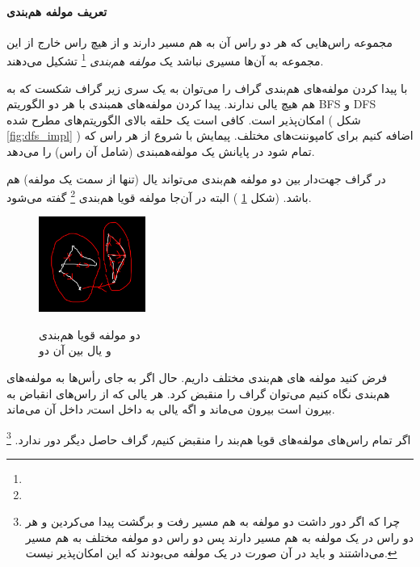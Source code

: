 \paragraph{تعریف مولفه هم‌بندی}
مجموعه‌ راس‌هایی که هر دو راس آن به هم مسیر دارند و از هیچ راس خارج از این مجموعه به آن‌ها مسیری نباشد یک 
\textit{
مولفه هم‌بندی
}
\footnote{}
تشکیل می‌دهند.

با پیدا کردن مولفه‌های هم‌بندی گراف را می‌توان به یک سری زیر گراف شکست که به هم هیچ یالی ندارند.
پیدا کردن مولفه‌های همبندی با هر دو الگوریتم
BFS
و 
DFS
امکان‌پذیر است.
کافی است یک حلقه بالای الگوریتم‌‌های مطرح شده (
شکل 
\ref{fig:dfs_impl}
)
اضافه کنیم برای کامپوننت‌های مختلف.
پیمایش با شروع از هر راس که تمام شود در پایانش یک مولفه‌همبندی (شامل آن راس) را می‌دهد.

در گراف جهت‌دار بین دو مولفه هم‌بندی می‌تواند یال (تنها از سمت یک مولفه) هم باشد. 
(شکل \ref{two_comp}
)
البته در آن‌جا مولفه قویا هم‌بندی
\footnote{}
 گفته می‌شود.

\begin{figure}
    \includegraphics[width=35mm]{components.png}
    \label{two_comp}
	 \caption{
	 دو مولفه قویا هم‌بندی
	 \\
	  و یال بین آن دو
	 }
\end{figure}


فرض کنید مولفه های هم‌بندی مختلف داریم.
حال اگر به جای رأس‌ها به مولفه‌های هم‌بندی نگاه کنیم می‌توان گراف را منقبض کرد. هر یالی که از راس‌های انقباض به بیرون است بیرون می‌ماند و اگه یالی به داخل است٫ 
داخل آن می‌ماند.

اگر تمام راس‌های مولفه‌های قویا هم‌بند
را منقبض کنیم٫ گراف حاصل دیگر دور ندارد.
\footnote{
 چرا که اگر دور داشت دو مولفه‌ به هم مسیر رفت و برگشت پیدا‌ می‌کردین و هر دو راس در یک مولفه به هم مسیر دارند پس 
دو راس دو مولفه مختلف به هم مسیر می‌داشتند و باید در آن‌ صورت در یک مولفه می‌بودند که این امکان‌پذیر نیست.
 }

